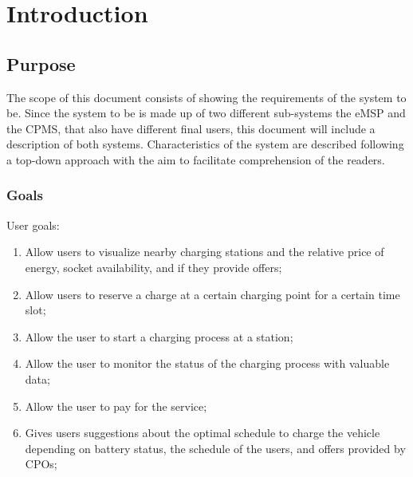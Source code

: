 \documentclass{Configuration_Files/PoliMi3i_thesis}
\begin{document}
\mainmatter %

\chapter{Introduction}

\section{Purpose}

The scope of this document consists of showing the requirements of the system to be. Since the system to be is made up of two different sub-systems the eMSP and the CPMS, that also have different final users, this document will include a description of both systems.
Characteristics of the system are described following a top-down approach with the aim to facilitate comprehension of the readers.


\subsection{Goals}
User goals:
\begin{enumerate}[label=\textbf{G\arabic*}]

    \item Allow users to visualize nearby charging stations and the relative price of energy, socket availability, and if they provide offers;
    
    \item Allow users to reserve a charge at a certain charging point for a certain time slot;
    
    \item Allow the user to start a charging process at a station;

    \item Allow the user to monitor the status of the charging process with valuable data;

    \item Allow the user to pay for the service;

    \item Gives users suggestions about the optimal schedule to charge the vehicle depending on battery status, the schedule of the users, and offers provided by CPOs;

\end{enumerate}
\end{document}
